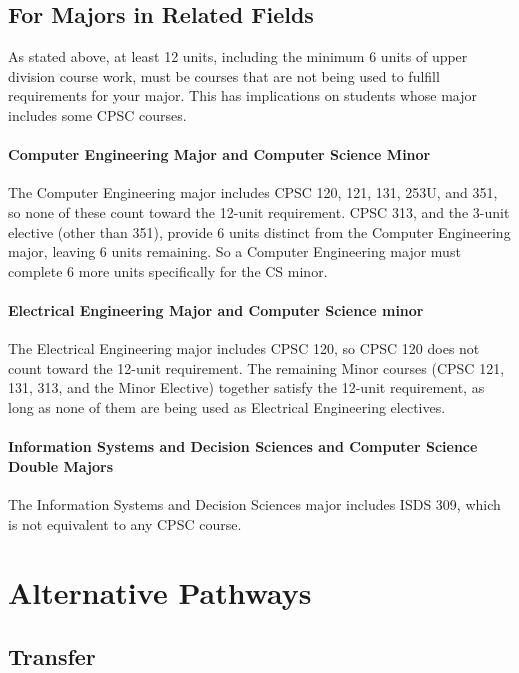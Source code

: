 \documentclass{book}
\begin{document}
\section{For Majors in Related Fields}

As stated above, at least 12 units, including the minimum 6 units of upper division course work, must be courses that are not being used to fulfill requirements for your major. This has implications on students whose major includes some CPSC courses.

\subsubsection{Computer Engineering Major and Computer Science Minor}

The Computer Engineering major includes CPSC 120, 121, 131, 253U, and 351, so none of these count toward the 12-unit requirement. CPSC 313, and the 3-unit elective (other than 351), provide 6 units distinct from the Computer Engineering major, leaving 6 units remaining. So a Computer Engineering major must complete 6 more units specifically for the CS minor.

\subsubsection{Electrical Engineering Major and Computer Science minor}

The Electrical Engineering major includes CPSC 120, so CPSC 120 does not count toward the 12-unit requirement. The remaining Minor courses (CPSC 121, 131, 313, and the Minor Elective) together satisfy the 12-unit requirement, as long as none of them are being used as Electrical Engineering electives.

\subsubsection{Information Systems and Decision Sciences and Computer Science Double Majors}

The Information Systems and Decision Sciences major includes ISDS 309, which is not equivalent to any CPSC course.
 
\chapter{Alternative Pathways}

\section{Transfer}
\end{document}
